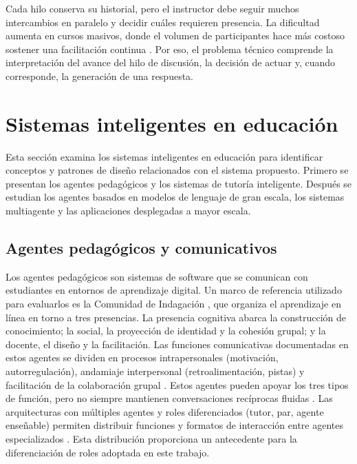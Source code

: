 Cada hilo conserva su historial, pero el instructor debe seguir muchos intercambios en paralelo y decidir cuáles requieren presencia. La dificultad aumenta en cursos masivos, donde el volumen de participantes hace más costoso sostener una facilitación continua \parencite{GuEtAl2021,YuEtAl2024maic}. Por eso, el problema técnico comprende la interpretación del avance del hilo de discusión, la decisión de actuar y, cuando corresponde, la generación de una respuesta.

\section{Sistemas inteligentes en educación}

Esta sección examina los sistemas inteligentes en educación para identificar conceptos y patrones de diseño relacionados con el sistema propuesto. Primero se presentan los agentes pedagógicos y los sistemas de tutoría inteligente. Después se estudian los agentes basados en modelos de lenguaje de gran escala, los sistemas multiagente y las aplicaciones desplegadas a mayor escala.

\subsection{Agentes pedagógicos y comunicativos}

Los agentes pedagógicos son sistemas de software que se comunican con estudiantes en entornos de aprendizaje digital. Un marco de referencia utilizado para evaluarlos es la Comunidad de Indagación \parencite{GarrisonEtAl2000}, que organiza el aprendizaje en línea en torno a tres presencias. La presencia cognitiva abarca la construcción de conocimiento; la social, la proyección de identidad y la cohesión grupal; y la docente, el diseño y la facilitación. Las funciones comunicativas documentadas en estos agentes se dividen en procesos intrapersonales (motivación, autorregulación), andamiaje interpersonal (retroalimentación, pistas) y facilitación de la colaboración grupal \parencite{SikstromEtAl2022}. Estos agentes pueden apoyar los tres tipos de función, pero no siempre mantienen conversaciones recíprocas fluidas \parencite{SikstromEtAl2022}. Las arquitecturas con múltiples agentes y roles diferenciados (tutor, par, agente enseñable) permiten distribuir funciones y formatos de interacción entre agentes especializados \parencite{LippertEtAl2020}. Esta distribución proporciona un antecedente para la diferenciación de roles adoptada en este trabajo.

